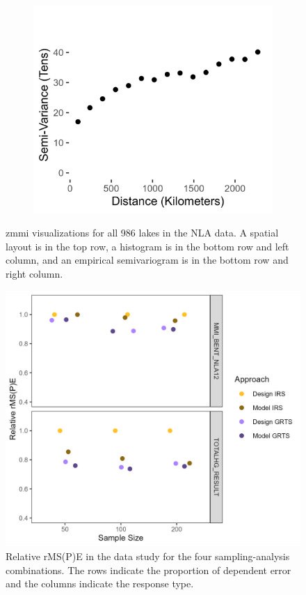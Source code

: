 \documentclass[]{elsarticle} %
\begin{document}
\begin{figure}
\begin{subfigure}{0.49\textwidth}
  \caption*{}
  \label{fig:zmmi_hist}
\end{subfigure}
\begin{subfigure}{0.49\textwidth}
  \centering
  \includegraphics[width = 1\linewidth]{figures/zmmi_sv_plot.jpeg}
  \caption*{}
  \label{fig:zmmi_sv_plot}
\end{subfigure}
\caption{zmmi visualizations for all 986 lakes in the NLA data. A spatial layout is in the top row, a histogram is in the bottom row and left column, and an empirical semivariogram is in the bottom row and right column.}
\label{fig:merc}
\end{figure}

\begin{figure}
  \centering
  \includegraphics[width = 1\linewidth]{figures/data_rmspe_eff.jpeg}
  \caption{Relative rMS(P)E in the data study for the four sampling-analysis combinations. The rows indicate the proportion of dependent error and the columns indicate the response type.}
  \label{fig:rmspe_eff}
\end{figure}
\end{document}
